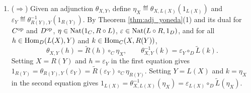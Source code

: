 \documentclass[10pt,a4paper]{article}
\begin{document}
\begin{enumerate}
\item ($\Longrightarrow$) Given an adjunction $\theta_{X,Y}$, define $\eta_X \eqdef \theta_{X,L(X)}(1_{L(X)})$ and $\varepsilon_Y \eqdef \theta_{R(Y),Y}^{-1}(1_{R(Y)})$. By Theorem \ref{thm:adj_yoneda}(1) and its dual for $C^{\textrm{op}}$ and $D^{\textrm{op}}$, $\eta \in {\textrm{Nat}}(1_C, R \circ L)$, $\varepsilon \in {\textrm{Nat}}(L \circ R, 1_D)$, and for all $h \in {\textrm{Hom}}_D(L(X), Y)$ and $k \in {\textrm{Hom}}_C(X, R(Y))$,
$$\theta_{X,Y}(h) = \widetilde{R}(h) \circ_C \eta_X, \qquad \theta_{X,Y}^{-1}(k) = \varepsilon_Y \circ_D \widetilde{L}(k).$$
Setting $X = R(Y)$ and $h = \varepsilon_Y$ in the first equation gives $1_{R(Y)} = \theta_{R(Y),Y}(\varepsilon_Y) = \widetilde{R}(\varepsilon_Y) \circ_C \eta_{R(Y)}$. Setting $Y = L(X)$ and $k = \eta_X$ in the second equation gives $1_{L(X)} = \theta_{X,L(X)}^{-1}(\eta_X) = \varepsilon_{L(X)} \circ_D \widetilde{L}(\eta_X)$.


\end{enumerate}
\end{document}
